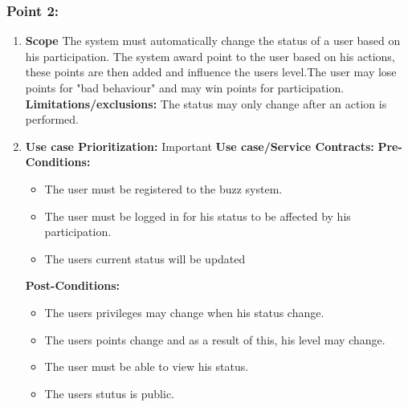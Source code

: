 \documentclass[11pt]{article}
\begin{document}
\subsubsection{Point 2:}
\begin{enumerate}
\item 
\textbf{Scope}
The system must automatically change the status of a user based on his participation. The system award point to the user based on his actions, these points are then added and influence the users level.The user may lose points for "bad behaviour" and may win points for participation.
\newline
\textbf{Limitations/exclusions:} The status may only change after an action is performed.
\item
\textbf{Use case Prioritization:} Important
\textbf{Use case/Service Contracts:} 
\newline
\textbf{Pre-Conditions: }
\begin{itemize}
\item The user must be registered to the buzz system.
\item The user must be logged in for his status to be affected by his participation.
\item The users current status will be updated
\end{itemize}
 \textbf{Post-Conditions: }
\begin{itemize}
\item The users privileges may change when his status change.
\item The users points change and as a result of this, his level may change.
\item The user must be able to view his status.
\item The users stutus is public.
\end{itemize}
\end{enumerate}
\end{document}
